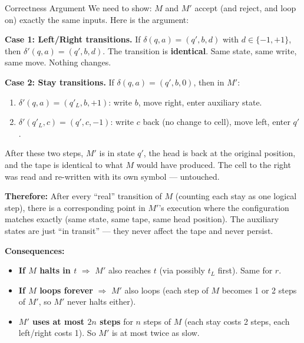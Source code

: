 \begin{conceptbox}{Correctness Argument \kemark}
We need to show: $M$ and $M'$ accept (and reject, and loop on) exactly the same inputs. Here is the argument:

\textbf{Case 1: Left/Right transitions.} If $\delta(q, a) = (q', b, d)$ with $d \in \{-1, +1\}$, then $\delta'(q, a) = (q', b, d)$. The transition is \textbf{identical}. Same state, same write, same move. Nothing changes.

\textbf{Case 2: Stay transitions.} If $\delta(q, a) = (q', b, 0)$, then in $M'$:
\begin{enumerate}[nosep]
\item $\delta'(q, a) = (q'_L, b, +1)$: write $b$, move right, enter auxiliary state.
\item $\delta'(q'_L, c) = (q', c, -1)$: write $c$ back (no change to cell), move left, enter $q'$.
\end{enumerate}

After these two steps, $M'$ is in state $q'$, the head is back at the original position, and the tape is identical to what $M$ would have produced. The cell to the right was read and re-written with its own symbol --- untouched.

\textbf{Therefore:} After every ``real'' transition of $M$ (counting each stay as one logical step), there is a corresponding point in $M'$'s execution where the configuration matches exactly (same state, same tape, same head position). The auxiliary states are just ``in transit'' --- they never affect the tape and never persist.

\textbf{Consequences:}
\begin{itemize}[nosep]
\item \textbf{If $M$ halts in $t$} $\Rightarrow$ $M'$ also reaches $t$ (via possibly $t_L$ first). Same for $r$.
\item \textbf{If $M$ loops forever} $\Rightarrow$ $M'$ also loops (each step of $M$ becomes 1 or 2 steps of $M'$, so $M'$ never halts either).
\item \textbf{$M'$ uses at most $2n$ steps} for $n$ steps of $M$ (each stay costs 2 steps, each left/right costs 1). So $M'$ is at most twice as slow.
\end{itemize}

\end{conceptbox}

